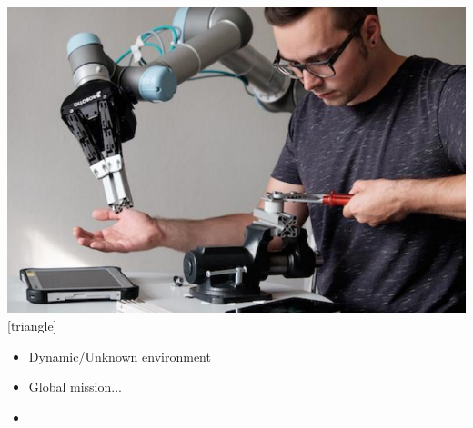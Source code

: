 \begin{frame}[noframenumbering]
\begin{columns}
                \column{.47\paperwidth}
                \begin{center}
                        \includegraphics[width=\textwidth ]{figures/complx_sit.pdf}
[triangle]    
 \vspace{2mm}                    
\begin{itemize}
\item Dynamic/Unknown environment
\item Global mission...
\setlength\itemsep{1.5em}
\item[\hookrightarrow] 
\end{itemize}

                        \end{center}

\end{columns}

\end{frame}











